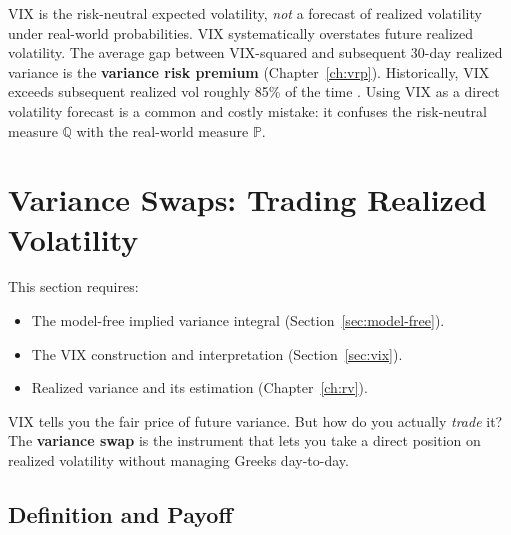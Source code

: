 \begin{warning}
VIX is the risk-neutral expected volatility, \emph{not} a forecast of realized volatility under real-world probabilities.
VIX systematically overstates future realized volatility.
The average gap between VIX-squared and subsequent 30-day realized variance is the \textbf{variance risk premium} (Chapter~\ref{ch:vrp}).
Historically, VIX exceeds subsequent realized vol roughly 85\% of the time \citep{Carr2009}.
Using VIX as a direct volatility forecast is a common and costly mistake: it confuses the risk-neutral measure $\mathbb{Q}$ with the real-world measure $\mathbb{P}$.
\end{warning}

\section{Variance Swaps: Trading Realized Volatility}\label{sec:var-swap}

\begin{prereq}
This section requires:
\begin{itemize}[nosep]
  \item The model-free implied variance integral (Section~\ref{sec:model-free}).
  \item The VIX construction and interpretation (Section~\ref{sec:vix}).
  \item Realized variance and its estimation (Chapter~\ref{ch:rv}).
\end{itemize}
\end{prereq}

VIX tells you the fair price of future variance.
But how do you actually \emph{trade} it?
The \textbf{variance swap} is the instrument that lets you take a direct position on realized volatility without managing Greeks day-to-day.

\subsection{Definition and Payoff}

